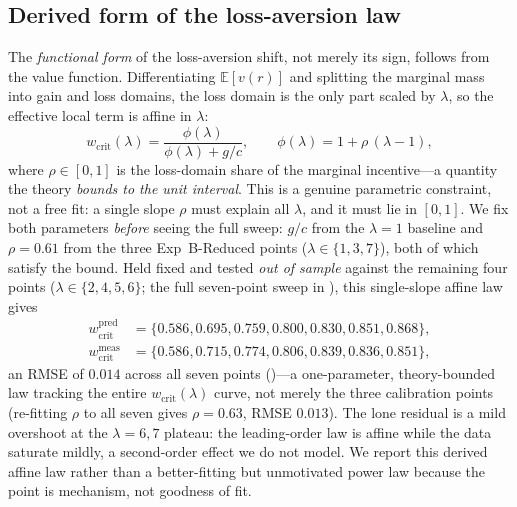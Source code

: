 \documentclass[letterpaper]{article}
\theoremstyle{plain}
\newcommand{\wcrit}{w_{\mathrm{crit}}}
\begin{document}
\subsection{Derived form of the loss-aversion law}
The \emph{functional form} of the loss-aversion shift, not merely its sign,
follows from the value function. Differentiating $\mathbb{E}[v(r)]$ and
splitting the marginal mass into gain and loss domains, the loss domain is
the only part scaled by $\lambda$, so the effective local term is affine in
$\lambda$:
\begin{equation}
  \wcrit(\lambda)=\frac{\phi(\lambda)}{\phi(\lambda)+g/c},
  \qquad \phi(\lambda)=1+\rho\,(\lambda-1),
  \label{eq:wcrit_lambda}
\end{equation}
where $\rho\in[0,1]$ is the loss-domain share of the marginal incentive---a
quantity the theory \emph{bounds to the unit interval}. This is a genuine
parametric constraint, not a free fit: a single slope $\rho$ must explain
all $\lambda$, and it must lie in $[0,1]$. We fix both parameters
\emph{before} seeing the full sweep: $g/c$ from the $\lambda{=}1$ baseline
and $\rho=0.61$ from the three Exp~B-Reduced points
($\lambda\in\{1,3,7\}$), both of which satisfy the bound. Held fixed and
tested \emph{out of sample} against the remaining four points
($\lambda\in\{2,4,5,6\}$; the full seven-point sweep in
), this single-slope affine law gives
\begin{equation*}
\begin{aligned}
\wcrit^{\text{pred}}&=\{0.586,0.695,0.759,0.800,0.830,0.851,0.868\},\\
\wcrit^{\text{meas}}&=\{0.586,0.715,0.774,0.806,0.839,0.836,0.851\},
\end{aligned}
\end{equation*}
an RMSE of $0.014$ across all seven points ()---a
one-parameter, theory-bounded law tracking the entire $\wcrit(\lambda)$ curve,
not merely the three calibration points (re-fitting $\rho$ to all seven gives
$\rho=0.63$, RMSE $0.013$). The lone residual is a mild overshoot at the
$\lambda{=}6,7$ plateau: the leading-order law is affine while the data saturate
mildly, a second-order effect we do not model. We report this derived affine law
rather than a better-fitting but unmotivated power law because the point is
mechanism, not goodness of fit.
\end{document}
